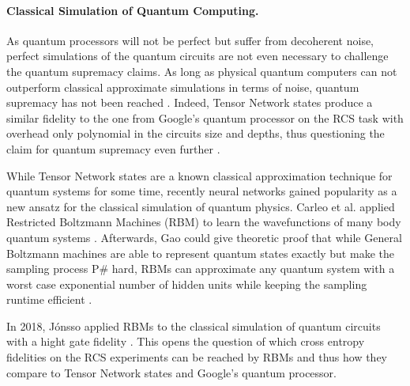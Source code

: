 \paragraph{Classical Simulation of Quantum Computing.}
As quantum processors will not be perfect but suffer from decoherent noise, perfect simulations 
of the quantum circuits are not even necessary to challenge the quantum supremacy claims. 
As long as physical quantum computers can not outperform classical approximate simulations in 
terms of noise, quantum supremacy has not been reached \cite{boixo2018characterizing}.
Indeed, Tensor Network states produce a similar fidelity to the one from Google's quantum processor on the RCS task 
with overhead only polynomial in the circuits size and depths, thus questioning the claim for quantum supremacy even further \cite{fefferman2015power}.

While Tensor Network states are a known classical approximation technique for quantum systems for 
some time, recently neural networks gained popularity as a new ansatz for the classical simulation
of quantum physics. Carleo et al. applied Restricted Boltzmann Machines (RBM) to learn the wavefunctions of many body 
quantum systems \cite{Carleo_2017}. Afterwards, Gao could give theoretic proof that while General 
Boltzmann machines are able to represent quantum states exactly but make the sampling process P\#
hard, RBMs can approximate any quantum system with a worst case exponential number of hidden units while keeping the 
sampling runtime efficient \cite{Gao_2017}.

In 2018, Jónsso applied RBMs to the classical simulation of 
quantum circuits with a hight gate fidelity \cite{jnsson2018neuralnetwork}. This opens the question of which 
cross entropy fidelities on the RCS experiments can be reached by RBMs and thus how they compare to 
Tensor Network states and Google's quantum processor.